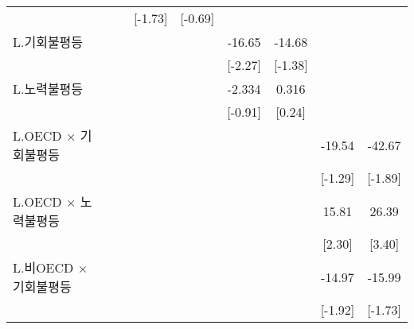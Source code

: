 \begin{tabular}{l*{8}{c}}
                    &                     &                     &     [-1.73]         &     [-0.69]         &                     &                     &                     &                     \\
\addlinespace
L.기회불평등        &                     &                     &                     &                     &      -16.65\sym{**} &      -14.68         &                     &                     \\
                    &                     &                     &                     &                     &     [-2.27]         &     [-1.38]         &                     &                     \\
\addlinespace
L.노력불평등        &                     &                     &                     &                     &      -2.334         &       0.316         &                     &                     \\
                    &                     &                     &                     &                     &     [-0.91]         &      [0.24]         &                     &                     \\
\addlinespace
L.OECD $\times$ 기회불평등&                     &                     &                     &                     &                     &                     &      -19.54         &      -42.67\sym{*}  \\
                    &                     &                     &                     &                     &                     &                     &     [-1.29]         &     [-1.89]         \\
\addlinespace
L.OECD $\times$ 노력불평등&                     &                     &                     &                     &                     &                     &       15.81\sym{**} &       26.39\sym{***}\\
                    &                     &                     &                     &                     &                     &                     &      [2.30]         &      [3.40]         \\
\addlinespace
L.비OECD $\times$ 기회불평등&                     &                     &                     &                     &                     &                     &      -14.97\sym{*}  &      -15.99\sym{*}  \\
                    &                     &                     &                     &                     &                     &                     &     [-1.92]        &     [-1.73]         \\

\end{tabular}
